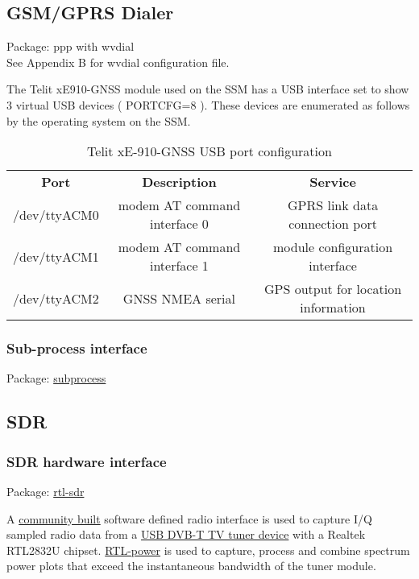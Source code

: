 \subsection{GSM/GPRS Dialer}
Package: 	ppp with wvdial\\
See Appendix B for wvdial configuration file.


The Telit xE910-GNSS module used on the SSM has a USB interface set to show 3 virtual USB devices ( PORTCFG=8 ). These devices are enumerated as follows by the operating system on the SSM.

\begin{table}[htpb]
  \centering
  \caption{Telit xE-910-GNSS USB port configuration}
    \begin{tabular}{ccc}
    \textbf{Port}   & \textbf{Description}          & \textbf{Service} \\
    /dev/ttyACM0    & modem AT command interface 0  & GPRS link data connection port\\
    /dev/ttyACM1    & modem AT command interface 1  & module configuration interface\\
    /dev/ttyACM2    & GNSS NMEA serial              & GPS output for location information\\
    \end{tabular}
\end{table}


\subsubsection{Sub-process interface}
Package:	\href{https://docs.python.org/2/library/subprocess.html}{subprocess}\\

\subsection{SDR}
\subsubsection{SDR hardware interface}
Package:	\href{http://sdr.osmocom.org/trac/wiki/rtl-sdr}{rtl-sdr}

A \href{http://sdr.osmocom.org/trac/wiki/rtl-sdr#Buildingthesoftware}{community built} software defined radio interface is used to capture I/Q sampled radio data from a \href{http://www.rtl-sdr.com/buy-rtl-sdr-dvb-t-dongles/}{ USB DVB-T TV tuner device} with a Realtek RTL2832U chipset. \href{http://kmkeen.com/rtl-power/}{RTL-power} is used to capture, process and combine spectrum power plots that exceed the instantaneous bandwidth of the tuner module.

